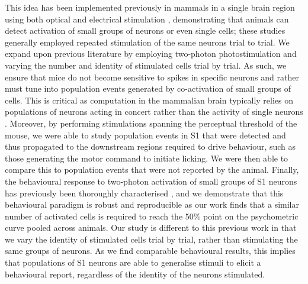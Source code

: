 This idea has been implemented previously in mammals in a single brain region using both optical \cite{huber_sparse_2008, histed_cortical_2014, gill_precise_2020, dalgleish_how_2020} and electrical stimulation \cite{romo_somatosensory_1998, houweling_behavioural_2008, doron_spiking_2014, tanke_single-cell_2018, buchan_stimulation_2018}, demonstrating that animals can detect activation of small groups of neurons or even single cells; these studies generally employed repeated stimulation of the same neurons trial to trial. We expand upon previous literature by employing two-photon photostimulation and varying the number and identity of stimulated cells trial by trial. As such, we ensure that mice do not become sensitive to spikes in specific neurons and rather must tune into population events generated by co-activation of small groups of cells. This is critical as computation in the mammalian brain typically relies on populations of neurons acting in concert rather than the activity of single neurons \cite{averbeck_neural_2006}. Moreover, by performing stimulations spanning the perceptual threshold of the mouse, we were able to study population events in S1 that were detected and thus propagated to the downstream regions required to drive behaviour, such as those generating the motor command to initiate licking. We were then able to compare this to population events that were not reported by the animal. Finally, the behavioural response to two-photon activation of small groups of  S1 neurons has previously been thoroughly characterised \cite{dalgleish_how_2020}, and we demonstrate that this behavioural paradigm is robust and reproducible as our work finds that a similar number of activated cells is required to reach the 50\% point on the psychometric curve pooled across animals. Our study is different to this previous work in that we vary the identity of stimulated cells trial by trial, rather than stimulating the same groups of neurons. As we find comparable behavioural results, this implies that populations of S1 neurons are able to generalise stimuli to elicit a behavioural report, regardless of the identity of the neurons stimulated.

